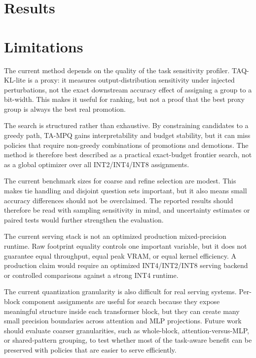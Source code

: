 \documentclass{article}
\newcommand{\method}{TA-MPQ}
\newcommand{\inttwo}{INT2}
\newcommand{\intfour}{INT4}
\newcommand{\inteight}{INT8}
\begin{document}
\section{Results}
\label{sec:results}



\section{Limitations}

The current method depends on the quality of the task sensitivity profiler. TAQ-KL-lite is a proxy: it measures output-distribution sensitivity under injected perturbations, not the exact downstream accuracy effect of assigning a group to a bit-width. This makes it useful for ranking, but not a proof that the best proxy group is always the best real promotion.

The search is structured rather than exhaustive. By constraining candidates to a greedy path, \method{} gains interpretability and budget stability, but it can miss policies that require non-greedy combinations of promotions and demotions. The method is therefore best described as a practical exact-budget frontier search, not as a global optimizer over all \inttwo{}/\intfour{}/\inteight{} assignments.

The current benchmark sizes for coarse and refine selection are modest. This makes tie handling and disjoint question sets important, but it also means small accuracy differences should not be overclaimed. The reported results should therefore be read with sampling sensitivity in mind, and uncertainty estimates or paired tests would further strengthen the evaluation.

The current serving stack is not an optimized production mixed-precision runtime. Raw footprint equality controls one important variable, but it does not guarantee equal throughput, equal peak VRAM, or equal kernel efficiency. A production claim would require an optimized \intfour{}/\inttwo{}/\inteight{} serving backend or controlled comparisons against a strong \intfour{} runtime.

The current quantization granularity is also difficult for real serving systems. Per-block component assignments are useful for search because they expose meaningful structure inside each transformer block, but they can create many small precision boundaries across attention and MLP projections. Future work should evaluate coarser granularities, such as whole-block, attention-versus-MLP, or shared-pattern grouping, to test whether most of the task-aware benefit can be preserved with policies that are easier to serve efficiently.
\end{document}
